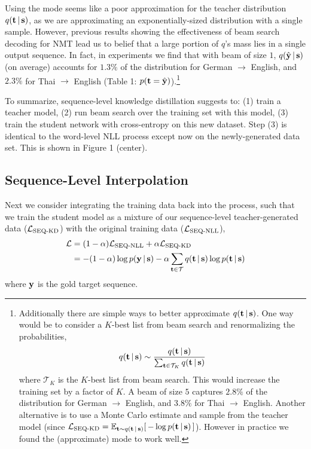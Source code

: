 \documentclass[11pt,letterpaper]{article}
\begin{document}
Using the mode seems like a poor approximation for
the teacher distribution $q(\mathbf{t} \,|\, \mathbf{s})$, as we are
approximating an exponentially-sized distribution with a single
sample. However, previous results showing the effectiveness of
beam search decoding for NMT lead us to belief that a large portion of
$q$'s mass lies in a single output sequence. In fact, in
experiments we find that with beam of size $1$, $q(\hat{\mathbf{y}} \,|\, \mathbf{s})$ (on average) accounts for
$1.3\%$ of the distribution for German $\rightarrow$ English, and
$2.3\%$ for Thai $\rightarrow$ English (Table 1: $p(\mathbf{t} = \hat{\mathbf{y}})$).\footnote{Additionally there
  are simple ways to better approximate $q(\mathbf{t} \,|\, \mathbf{s})$.  One way would be to
  consider a $K$-best list from beam search and renormalizing the
  probabilities,
\begin{equation*}
q(\mathbf{t} \,|\, \mathbf{s}) \sim \frac{q( \mathbf{t} \,|\, \mathbf{s})}{\sum_{\mathbf{t} \in \mathcal{T}_K} q(\mathbf{t} \,|\, \mathbf{s})}
\end{equation*}
where $\mathcal{T}_K$ is the $K$-best list from beam search. This would increase the training
set by a factor of $K$.  A beam of size
 $5$ captures $2.8\%$ of the distribution for German $\rightarrow$ English, and
 $3.8\%$ for Thai $\rightarrow$ English.
 Another alternative is to use a Monte Carlo estimate and sample from the teacher model
(since
$\mathcal{L}_{\text{SEQ-KD}} = \mathbb{E}_{\mathbf{t}\sim q(\mathbf{t} \,|\, \mathbf{s})}[\,-\log p(\mathbf{t} \,|\, \mathbf{s}) \,]$).
However in practice we found the (approximate) mode to work well.}


To summarize, sequence-level knowledge distillation suggests to: (1)
train a teacher model, (2) run beam search over the training set with
this model, (3) train the student network with cross-entropy on this
new dataset. Step (3) is identical to the word-level NLL process
except now on the newly-generated data set. This is shown in Figure 1 (center).

\subsection{Sequence-Level Interpolation}\label{local}

Next we consider integrating the training data back into the process,
such that we train the student model as a mixture of our
sequence-level teacher-generated data ($\mathcal{L}_\text{SEQ-KD}$) with the original training data 
($\mathcal{L}_\text{SEQ-NLL}$),
\begin{align*}
\mathcal{L} &= (1-\alpha)\mathcal{L}_{\text{SEQ-NLL}} + \alpha \mathcal{L}_{\text{SEQ-KD}} \\
&= -(1-\alpha)\log p(\mathbf{y} \,|\, \mathbf{s}) -\alpha \sum_{\mathbf{t} \in \mathcal{T}} q(\mathbf{t} \,|\, \mathbf{s}) \log p (\mathbf{t} \,|\, \mathbf{s})
\end{align*}
where $\mathbf{y}$ is the gold target sequence.
\end{document}

